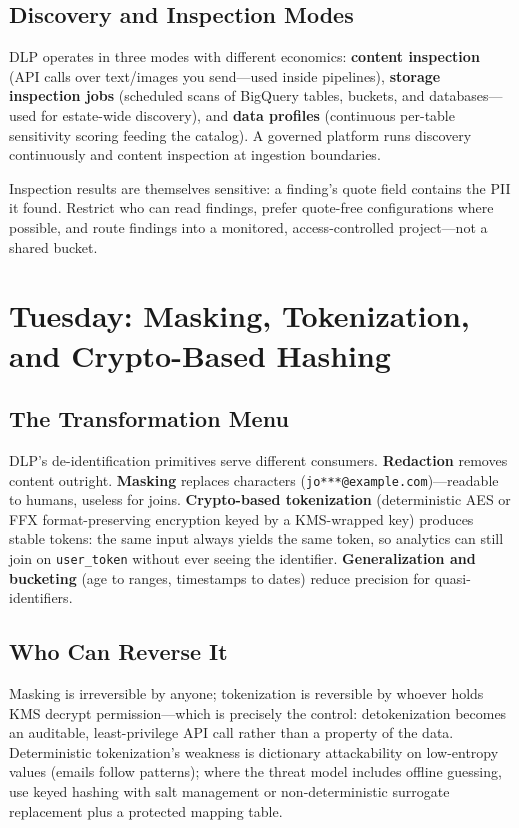 \subsection{Discovery and Inspection Modes}
DLP operates in three modes with different economics: \textbf{content inspection} (API calls over text/images you send---used inside pipelines), \textbf{storage inspection jobs} (scheduled scans of BigQuery tables, buckets, and databases---used for estate-wide discovery), and \textbf{data profiles} (continuous per-table sensitivity scoring feeding the catalog). A governed platform runs discovery continuously and content inspection at ingestion boundaries.

\begin{pitfall}
Inspection results are themselves sensitive: a finding's quote field contains the PII it found. Restrict who can read findings, prefer quote-free configurations where possible, and route findings into a monitored, access-controlled project---not a shared bucket.
\end{pitfall}

\section{Tuesday: Masking, Tokenization, and Crypto-Based Hashing}

\subsection{The Transformation Menu}
DLP's de-identification primitives serve different consumers. \textbf{Redaction} removes content outright. \textbf{Masking} replaces characters (\texttt{jo***@example.com})---readable to humans, useless for joins. \textbf{Crypto-based tokenization} (deterministic AES or FFX format-preserving encryption keyed by a KMS-wrapped key) produces stable tokens: the same input always yields the same token, so analytics can still join on \texttt{user\_token} without ever seeing the identifier. \textbf{Generalization and bucketing} (age to ranges, timestamps to dates) reduce precision for quasi-identifiers.

\subsection{Who Can Reverse It}
Masking is irreversible by anyone; tokenization is reversible by whoever holds KMS decrypt permission---which is precisely the control: detokenization becomes an auditable, least-privilege API call rather than a property of the data. Deterministic tokenization's weakness is dictionary attackability on low-entropy values (emails follow patterns); where the threat model includes offline guessing, use keyed hashing with salt management or non-deterministic surrogate replacement plus a protected mapping table.

